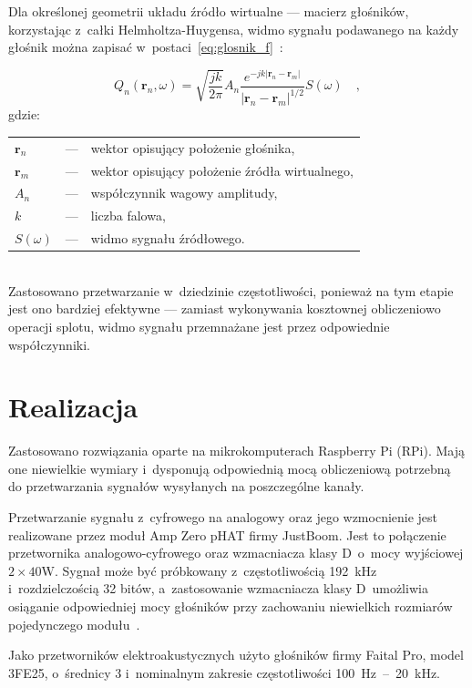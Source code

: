\documentclass[10pt, a4paper]{article}
\let\Oldsection\section
\renewcommand{\section}{\FloatBarrier\Oldsection}
\begin{document}
Dla określonej geometrii układu źródło wirtualne --- macierz głośników,
korzystając z~całki Helmholtza-Huygensa, widmo sygnału podawanego na każdy głośnik można zapisać
w~postaci~\eqref{eq:glosnik_f}~\cite{enhancement}:

\begin{equation}
  Q_n(\bm{r}_n,\omega) = \sqrt{\frac{jk}{2\pi}} A_n \frac {e^{-jk|\bm{r}_n-\bm{r}_m|}}{|\bm{r}_n-\bm{r}_m|^{1/2}} S(\omega) \quad,
  \label{eq:glosnik_f}
\end{equation}
gdzie:\\
\indent \begin{tabular}{l c p{}}
  $\bm{r}_n$ & --- & wektor opisujący położenie głośnika, \\
  $\bm{r}_m$ & --- & wektor opisujący położenie źródła wirtualnego,\\
  $A_n$ & --- & współczynnik wagowy amplitudy,\\
  $k$ & --- & liczba falowa,\\
  $S(\omega)$ & --- & widmo sygnału źródłowego.
\end{tabular}\\

Zastosowano przetwarzanie w~dziedzinie częstotliwości, ponieważ na tym etapie jest ono bardziej efektywne
--- zamiast wykonywania kosztownej obliczeniowo operacji splotu, widmo sygnału przemnażane jest przez
odpowiednie współczynniki.

\section{Realizacja}

Zastosowano rozwiązania oparte na mikrokomputerach Raspberry
Pi (RPi). Mają one niewielkie wymiary i~dysponują odpowiednią mocą obliczeniową
potrzebną do przetwarzania sygnałów wysyłanych na poszczególne kanały.

Przetwarzanie sygnału z~cyfrowego na analogowy oraz jego wzmocnienie jest
realizowane przez moduł Amp Zero pHAT firmy JustBoom. Jest to połączenie
przetwornika analogowo-cyfrowego oraz wzmacniacza klasy D~o~mocy wyjściowej
$2\times40\si{\watt}$. Sygnał może być próbkowany z~częstotliwością
\SI{192}{\kilo\hertz} i~rozdzielczością \num{32} bitów, a~zastosowanie
wzmacniacza klasy D~umożliwia osiąganie odpowiedniej mocy głośników przy
zachowaniu niewielkich rozmiarów pojedynczego modułu~\cite{oska}.

Jako przetworników elektroakustycznych użyto głośników firmy Faital Pro, model 3FE25,
o~średnicy \SI{3}{\inch} i~nominalnym zakresie 
częstotliwości \SI{100}{\hertz}~--~\SI{20}{\kilo\hertz}.
\end{document}
